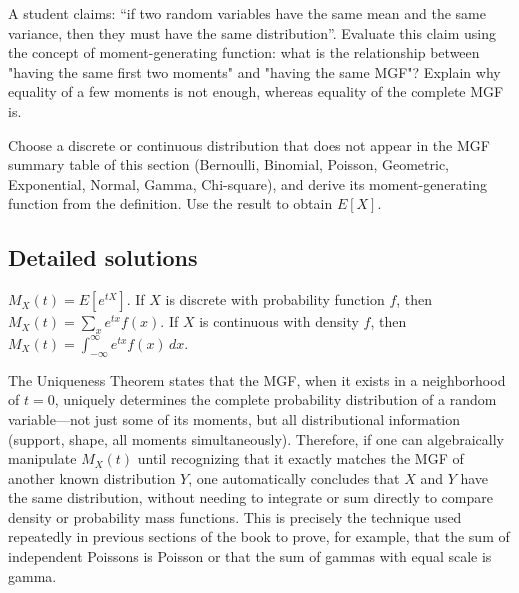 \begin{problema}
	\label{prob:5098ae4}
	A student claims: ``if two random variables have the same mean and the same variance, then they must have the same distribution''. Evaluate this claim using the concept of moment-generating function: what is the relationship between "having the same first two moments" and "having the same MGF"? Explain why equality of a few moments is not enough, whereas equality of the complete MGF is.
\end{problema}

\begin{problema}
	\label{prob:a48cc99}
	Choose a discrete or continuous distribution that does not appear in the MGF summary table of this section (Bernoulli, Binomial, Poisson, Geometric, Exponential, Normal, Gamma, Chi-square), and derive its moment-generating function from the definition. Use the result to obtain $E[X]$.
\end{problema}

\subsection*{Detailed solutions}

\begin{solproblema}[prob:5a5f63a]
	$M_X(t) = E[e^{tX}]$. If $X$ is discrete with probability function $f$, then $M_X(t) = \sum_x e^{tx}f(x)$. If $X$ is continuous with density $f$, then $M_X(t) = \int_{-\infty}^{\infty} e^{tx}f(x)\,dx$.
\end{solproblema}

\begin{solproblema}[prob:f26d9b0]
	The Uniqueness Theorem states that the MGF, when it exists in a neighborhood of $t=0$, uniquely determines the complete probability distribution of a random variable---not just some of its moments, but all distributional information (support, shape, all moments simultaneously). Therefore, if one can algebraically manipulate $M_X(t)$ until recognizing that it exactly matches the MGF of another known distribution $Y$, one automatically concludes that $X$ and $Y$ have the same distribution, without needing to integrate or sum directly to compare density or probability mass functions. This is precisely the technique used repeatedly in previous sections of the book to prove, for example, that the sum of independent Poissons is Poisson or that the sum of gammas with equal scale is gamma.
\end{solproblema}

